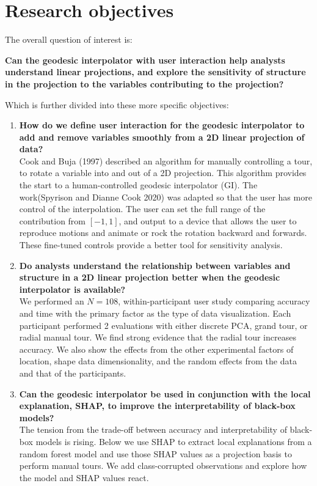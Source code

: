 \documentclass[
  11,
]{article}
\begin{document}
\hypertarget{research-objectives}{%
\section{Research objectives}\label{research-objectives}}

The overall question of interest is:

\textbf{Can the geodesic interpolator with user interaction help analysts understand linear projections, and explore the sensitivity of structure in the projection to the variables contributing to the projection?}

Which is further divided into these more specific objectives:

\begin{enumerate}
\def\labelenumi{\arabic{enumi}.}
\item
  \textbf{How do we define user interaction for the geodesic interpolator to add and remove variables smoothly from a 2D linear projection of data?}\\
  Cook and Buja (1997) described an algorithm for manually controlling a tour, to rotate a variable into and out of a 2D projection. This algorithm provides the start to a human-controlled geodesic interpolator (GI). The work(Spyrison and Dianne Cook 2020) was adapted so that the user has more control of the interpolation. The user can set the full range of the contribution from \([-1, 1]\), and output to a device that allows the user to reproduce motions and animate or rock the rotation backward and forwards. These fine-tuned controls provide a better tool for sensitivity analysis.
\item
  \textbf{Do analysts understand the relationship between variables and structure in a 2D linear projection better when the geodesic interpolator is available?}\\
  We performed an \(N=108\), within-participant user study comparing accuracy and time with the primary factor as the type of data visualization. Each participant performed 2 evaluations with either discrete PCA, grand tour, or radial manual tour. We find strong evidence that the radial tour increases accuracy. We also show the effects from the other experimental factors of location, shape data dimensionality, and the random effects from the data and that of the participants.
\item
  \textbf{Can the geodesic interpolator be used in conjunction with the local explanation, SHAP, to improve the interpretability of black-box models?}\\
  The tension from the trade-off between accuracy and interpretability of black-box models is rising. Below we use SHAP to extract local explanations from a random forest model and use those SHAP values as a projection basis to perform manual tours. We add class-corrupted observations and explore how the model and SHAP values react.
\end{enumerate}
\end{document}
